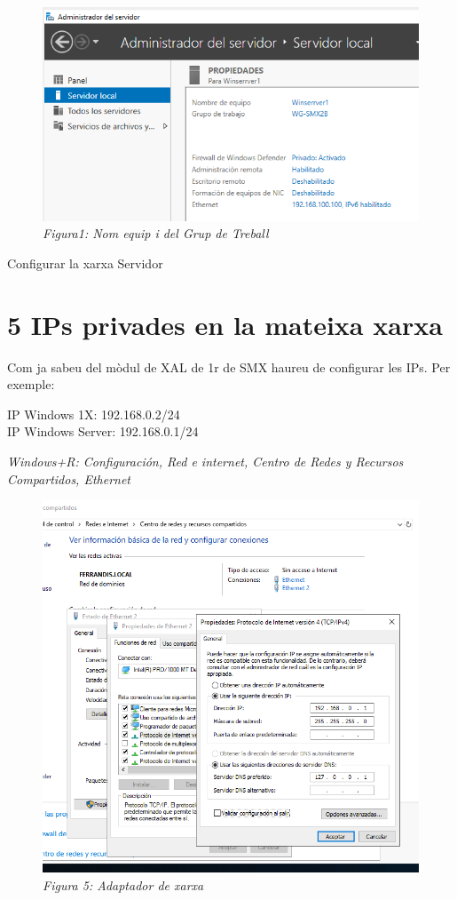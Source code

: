 \documentclass[
  a4paper,
]{article}
\begin{document}
\begin{figure}
\centering
\includegraphics{png/WorkgroupNomEquip.png}
\caption{\emph{Figura1: Nom equip i del Grup de Treball}}
\end{figure}

Configurar la xarxa Servidor

\section{5 IPs privades en la mateixa
xarxa}\label{ips-privades-en-la-mateixa-xarxa}

Com ja sabeu del mòdul de XAL de 1r de SMX haureu de configurar les IPs.
Per exemple:

IP Windows 1X: 192.168.0.2/24\\
IP Windows Server: 192.168.0.1/24

\emph{Windows+R: Configuración, Red e internet, Centro de Redes y
Recursos Compartidos, Ethernet}

\begin{figure}
\centering
\includegraphics{png/tarja2.png}
\caption{\emph{Figura 5: Adaptador de xarxa}}
\end{figure}
\end{document}
